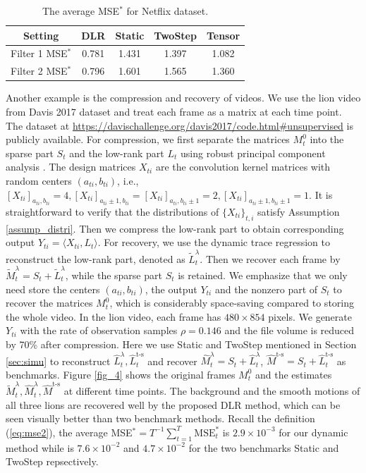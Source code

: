 \documentclass[12pt]{article}
\begin{document}
\begin{table}[!ht]
     \centering
      \caption{The average MSE$^*$ for Netflix dataset.}
      \label{table:netflix}
     \begin{tabular}{c|c|c|c|c}
     \hline
         Setting & DLR & Static & TwoStep & Tensor\\
         \hline
         Filter 1 MSE$^*$& 0.781& 1.431&  1.397&1.082\\
         \hline
          Filter 2 MSE$^*$&0.796&  1.601&1.565 & 1.360\\
         \hline
     \end{tabular}
 \end{table}
  Another example is the compression and recovery of videos. We use the lion video from Davis 2017 dataset \citep{Pont-Tuset_arXiv_2017} and treat each frame as a matrix at each time point. The dataset at \href{https://davischallenge.org/davis2017/code.html\#unsupervised}{https://davischallenge.org/davis2017/code.html\#unsupervised} is publicly available. For compression, we first separate the matrices $M^0_t$ into the sparse part $S_t$ and the low-rank part $L_t$ using robust principal component analysis \citep{candes2011robust}. The design matrices $X_{ti}$ are the convolution kernel matrices with random centers $(a_{ti},b_{ti})$, i.e., $[X_{ti}]_{a_{ti},b_{ti}} = 4,[X_{ti}]_{a_{ti}\pm1,b_{ti}}=[X_{ti}]_{a_{ti},b_{ti}\pm1}=2,[X_{ti}]_{a_{ti}\pm1,b_{ti}\pm1}=1$. It is straightforward to verify that the distributions of $\{X_{ti}\}_{t,i}$ satisfy Assumption \ref{assump_distri}. Then we compress the low-rank part to obtain corresponding output $Y_{ti} = \langle X_{ti},L_t\rangle$. For recovery, we use the dynamic trace regression  to reconstruct the low-rank part, denoted as $\widetilde{L}_t^\lambda$. Then we recover each frame by $\widetilde{M}_t^\lambda = S_t +\widetilde{L}^\lambda_t$, while the sparse part $S_t$ is retained. We emphasize that we only need store the centers $(a_{ti},b_{ti})$, the output $Y_{ti}$ and the nonzero part of $S_t$ to recover the matrices $M_t^0$, which is considerably space-saving compared to storing the whole video. 
  In the lion video, each frame has $480\times 854$ pixels. We generate $Y_{ti}$ with the rate of observation samples $\rho=0.146$ and the file volume is reduced by 70\% after compression.   
  Here we use Static and TwoStep mentioned in Section \ref{sec:simu} to reconstruct $\widehat{L}_t^\lambda, \widehat{L}_t^{\text{t-s}}$ and recover $\widehat{M}^\lambda_t = S_t +\widehat{L}_t^\lambda$, $\widehat{M}^{\text{t-s}} = S_t +\widehat{L}_t^{\text{t-s}}$ as benchmarks.
  Figure \ref{fig_4} shows the original frames $M_t^0$ and the estimates $\widetilde{M}^\lambda_t, \widehat{M}_t^\lambda, \widehat{M}^{\text{t-s}}$ at different time points. The background and the smooth motions of all three lions are recovered well by the proposed DLR method, which can be seen visually better than two benchmark methods.  Recall the definition (\ref{eq:mse2}), the average MSE$^*=T^{-1}\sum_{t=1}^T \mbox{MSE}^*_t$ is $2.9\times 10^{-3}$ for our dynamic method while is $7.6\times 10^{-2}$ and $4.7\times 10^{-2}$ for the two benchmarks Static and TwoStep repsectively.
\end{document}

